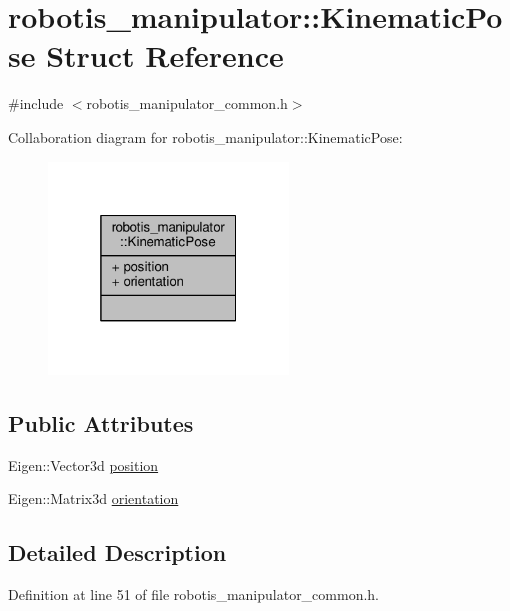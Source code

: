 \hypertarget{structrobotis__manipulator_1_1_kinematic_pose}{}\section{robotis\+\_\+manipulator\+:\+:Kinematic\+Pose Struct Reference}
\label{structrobotis__manipulator_1_1_kinematic_pose}


{\ttfamily \#include $<$robotis\+\_\+manipulator\+\_\+common.\+h$>$}



Collaboration diagram for robotis\+\_\+manipulator\+:\+:Kinematic\+Pose\+:\nopagebreak
\begin{figure}[H]
\begin{center}
\leavevmode
\includegraphics[width=181pt]{structrobotis__manipulator_1_1_kinematic_pose__coll__graph}
\end{center}
\end{figure}
\subsection*{Public Attributes}
\begin{DoxyCompactItemize}
\item 
Eigen\+::\+Vector3d \hyperlink{structrobotis__manipulator_1_1_kinematic_pose_a8700e7ae2388242cf540e884d52fd97a}{position}
\item 
Eigen\+::\+Matrix3d \hyperlink{structrobotis__manipulator_1_1_kinematic_pose_a0506da3cc344d21656fdd1befdd7fa27}{orientation}
\end{DoxyCompactItemize}


\subsection{Detailed Description}


Definition at line 51 of file robotis\+\_\+manipulator\+\_\+common.\+h.



